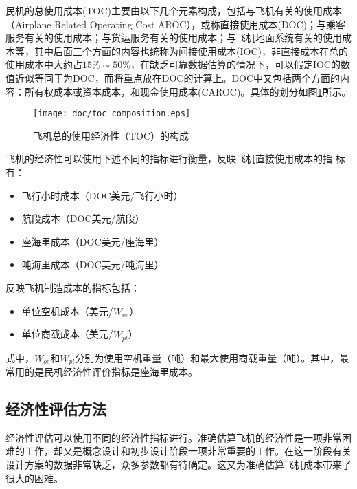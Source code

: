 
民机的总使用成本(TOC)主要由以下几个元素构成，包括与飞机有关的使用成本（Airplane Related Operating Cost AROC），或称直接使用成本(DOC)；与乘客服务有关的使用成本；与货运服务有关的使用成本；与飞机地面系统有关的使用成本等，其中后面三个方面的内容也统称为间接使用成本(IOC)，非直接成本在总的使用成本中大约占$15\%\sim50\%$，在缺乏可靠数据估算的情况下，可以假定IOC的数值近似等同于为DOC，而将重点放在DOC的计算上。DOC中又包括两个方面的内容：所有权成本或资本成本，和现金使用成本(CAROC)。具体的划分如图\ref{fig_toc}所示。
\begin{figure}
\begin{center}
  \texttt{[image: doc/toc\_composition.eps]}
  \caption{飞机总的使用经济性（TOC）的构成}
  \label{fig_toc}
\end{center}
\end{figure}

飞机的经济性可以使用下述不同的指标进行衡量，反映飞机直接使用成本的指
标有：
\begin{itemize}
\item[(1)]飞行小时成本（DOC美元/飞行小时）
\item[(2)]航段成本（DOC美元/航段）
\item[(3)]座海里成本（DOC美元/座海里）
\item[(4)]吨海里成本（DOC美元/吨海里）
\end{itemize}
反映飞机制造成本的指标包括：
\begin{itemize}
\item[(1)]单位空机成本（美元/$W_{oe}$）
\item[(2)]单位商载成本（美元/$W_{pl}$）
\end{itemize}

式中，$W_{oe}$和$W_{pl}$分别为使用空机重量（吨）和最大使用商载重量（吨）。其中，最常用的是民机经济性评价指标是座海里成本。

\subsection{经济性评估方法}\label{c13.1.2}
经济性评估可以使用不同的经济性指标进行。准确估算飞机的经济性是一项非常困难的工作，却又是概念设计和初步设计阶段一项非常重要的工作。在这一阶段有关设计方案的数据非常缺乏，众多参数都有待确定。这又为准确估算飞机成本带来了很大的困难。

